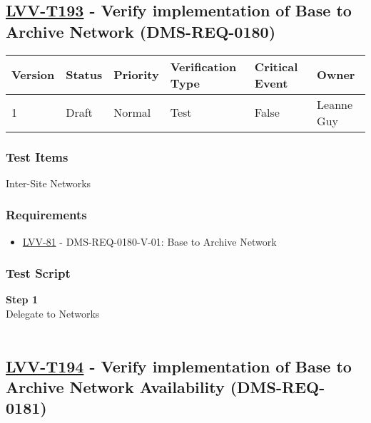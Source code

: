 \hypertarget{lvv-t193---verify-implementation-of-base-to-archive-network-dms-req-0180}{%
\subsection{\texorpdfstring{\href{https://jira.lsstcorp.org/secure/Tests.jspa\#/testCase/LVV-T193}{LVV-T193}
- Verify implementation of Base to Archive Network
(DMS-REQ-0180)}{LVV-T193 - Verify implementation of Base to Archive Network (DMS-REQ-0180)}}\label{lvv-t193---verify-implementation-of-base-to-archive-network-dms-req-0180}}

\begin{longtable}[]{@{}llllll@{}}
\toprule
Version & Status & Priority & Verification Type & Critical Event &
Owner\tabularnewline
\midrule
\endhead
1 & Draft & Normal & Test & False & Leanne Guy\tabularnewline
\bottomrule
\end{longtable}

\hypertarget{test-items-169}{%
\subsubsection{Test Items}\label{test-items-169}}

Inter-Site Networks~

\hypertarget{requirements-170}{%
\subsubsection{Requirements}\label{requirements-170}}

\begin{itemize}
\tightlist
\item
  \href{https://jira.lsstcorp.org/browse/LVV-81}{LVV-81} -
  DMS-REQ-0180-V-01: Base to Archive Network
\end{itemize}

\hypertarget{test-script-170}{%
\subsubsection{Test Script}\label{test-script-170}}

\textbf{Step 1}\\
Delegate to Networks\\
~\\

\hypertarget{lvv-t194---verify-implementation-of-base-to-archive-network-availability-dms-req-0181}{%
\subsection{\texorpdfstring{\href{https://jira.lsstcorp.org/secure/Tests.jspa\#/testCase/LVV-T194}{LVV-T194}
- Verify implementation of Base to Archive Network Availability
(DMS-REQ-0181)}{LVV-T194 - Verify implementation of Base to Archive Network Availability (DMS-REQ-0181)}}\label{lvv-t194---verify-implementation-of-base-to-archive-network-availability-dms-req-0181}}

